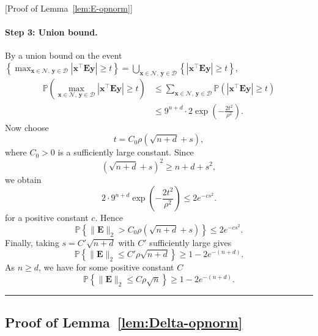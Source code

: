 \documentclass{article}
\newcommand{\pr}[1]{\mbox{}\mathbb{P}\left(#1\right)}
\newcommand{\xb}{\mathbf{x}}
\newcommand{\yb}{\mathbf{y}}
\newcommand{\Eb}{\mathbf{E}}
\newcommand{\Dcal}{\mathcal{D}}
\newcommand{\Ncal}{\mathcal{N}}
\newcommand{\BlackBox}{\rule{1.5ex}{1.5ex}}  %
\newenvironment{proof}{\par\noindent{\bf Proof\ }}{\hfill\BlackBox\par\medskip}
\newcommand{\rbr}[1]{\left(#1\right)}
\newcommand{\cbr}[1]{\left\{#1\right\}}
\newcommand{\abr}[1]{\left|#1\right|}
\begin{document}
\begin{proof}[Proof of Lemma~\ref{lem:E-opnorm}]
\paragraph{Step 3: Union bound.}
By a union bound on the event $\cbr{\max_{\xb\in\Ncal,\,\yb\in\Dcal}\abr{\xb^\top \Eb \yb} \ge t} = \bigcup_{\xb\in\Ncal,\,\yb\in\Dcal}\cbr{\abr{\xb^\top \Eb \yb} \ge t}$,
\begin{align*}
    \pr{\max_{\xb\in\Ncal,\,\yb\in\Dcal}\abr{\xb^\top \Eb \yb} \ge t}
    &\le \sum_{\xb\in\Ncal,\,\yb\in\Dcal}\pr{\abr{\xb^\top \Eb \yb} \ge t}\\
    &\le 9^{n+d} \cdot 2\exp\rbr{-\frac{2 t^2}{\rho^2}}.
\end{align*}
Now choose
\[
    t=C_0\rho(\sqrt{n+d}+s),
\]
where $C_0>0$ is a sufficiently large constant. Since
\[
    (\sqrt{n+d}+s)^2\ge n+d+s^2,
\]
we obtain
\[
    2\cdot 9^{n+d}
    \exp\left(-\frac{2t^2}{\rho^2}\right)
    \le
    2e^{-cs^2}.
\]
for a positive constant $c$. Hence
\[
    \mathbb P\left\{
    \|\Eb\|_2>C_0\rho(\sqrt{n+d}+s)
    \right\}
    \le
    2e^{-cs^2}.
\]
Finally, taking $s=C'\sqrt{n+d}$ with $C'$ sufficiently large gives
\[
    \mathbb P\left\{
    \|\Eb\|_2\le C'\rho\sqrt{n+d}
    \right\}
    \ge
    1-2e^{-(n+d)}.
\]
As $n\ge d$, we have for some positive constant $C$
\[
    \mathbb P\left\{
    \|\Eb\|_2\le C\rho\sqrt n
    \right\}
    \ge
    1-2e^{-(n+d)}.
\]
\end{proof}


\subsection{Proof of Lemma~\ref{lem:Delta-opnorm}}\label{app:Delta-opnorm}
\end{document}
